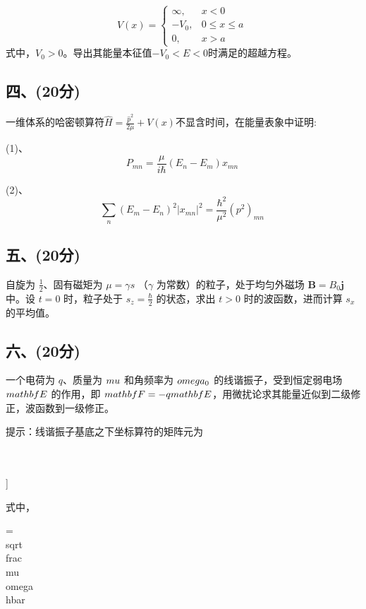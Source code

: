 \[
V(x) = \begin{cases} 
\infty, & x < 0 \\
-V_0, & 0 \leq x \leq a \\
0, & x > a
\end{cases}~
\] 
式中，$V_0>0$。导出其能量本征值$-V_0<E<0$时满足的超越方程。
\subsection{四、(20分)}
一维体系的哈密顿算符$\hat{H}=\frac{\hat{p}^2}{2\mu}+V(x)$不显含时间，在能量表象中证明:

(1)、$$P_{mn}=\frac{\mu}{i\hbar}(E_n-E_m)x_{mn}~$$

(2)、$$\sum_n (E_m - E_n)^2 |x_{mn}|^2 = \frac{\hbar^2}{\mu^2} (p^2)_{mn}~$$
\subsection{五、(20分)}
自旋为 $\frac{1}{2}$、固有磁矩为 $\mu = \gamma s$ （$\gamma$ 为常数）的粒子，处于均匀外磁场 $\mathbf{B} = B_0 \mathbf{j}$ 中。设 $t = 0$ 时，粒子处于 $s_z = \frac{\hbar}{2}$ 的状态，求出 $t > 0$ 时的波函数，进而计算 $s_x$ 的平均值。
\subsection{六、(20分)}
一个电荷为 $q$、质量为 $\\mu$ 和角频率为 $\\omega_0$ 的线谐振子，受到恒定弱电场 $\\mathbf{E}$ 的作用，即 $\\mathbf{F} = -q \\mathbf{E}$，用微扰论求其能量近似到二级修正，波函数到一级修正。

提示：线谐振子基底之下坐标算符的矩阵元为

\\[\\langle m | \\hat{x} | n \\rangle = \\frac{1}{\\alpha} \\left[ \\sqrt{\\frac{n}{2}} \\delta_{m, n-1} + \\sqrt{\\frac{n+1}{2}} \\delta_{m, n+1} \\right]\\]

式中，

$$\alpha = \\sqrt{\\frac{\\mu \\omega}{\\hbar}}\\